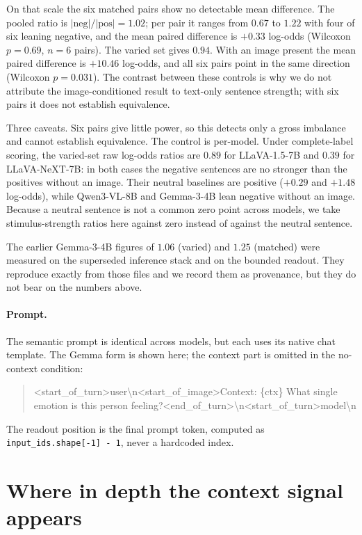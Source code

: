 \documentclass{article}
\newcommand{\gemma}{Gemma-3-4B}
\newcommand{\qwen}{Qwen3-VL-8B}
\newcommand{\llava}{LLaVA-1.5-7B}
\newcommand{\llavanext}{LLaVA-NeXT-7B}
\begin{document}
On that scale the six matched pairs show no detectable mean difference. The pooled ratio is $|\text{neg}|/|\text{pos}|=1.02$; per pair it ranges from $0.67$ to $1.22$ with four of six leaning negative, and the mean paired difference is $+0.33$ log-odds (Wilcoxon $p=0.69$, $n=6$ pairs). The varied set gives $0.94$. With an image present the mean paired difference is $+10.46$ log-odds, and all six pairs point in the same direction (Wilcoxon $p=0.031$). The contrast between these controls is why we do not attribute the image-conditioned result to text-only sentence strength; with six pairs it does not establish equivalence.

Three caveats. Six pairs give little power, so this detects only a gross imbalance and cannot establish equivalence. The control is per-model. Under complete-label scoring, the varied-set raw log-odds ratios are $0.89$ for \llava{} and $0.39$ for \llavanext{}: in both cases the negative sentences are no stronger than the positives without an image. Their neutral baselines are positive ($+0.29$ and $+1.48$ log-odds), while \qwen{} and \gemma{} lean negative without an image. Because a neutral sentence is not a common zero point across models, we take stimulus-strength ratios here against zero instead of against the neutral sentence.

The earlier \gemma{} figures of $1.06$ (varied) and $1.25$ (matched) were measured on the superseded inference stack and on the bounded readout. They reproduce exactly from those files and we record them as provenance, but they do not bear on the numbers above.

\paragraph{Prompt.}
The semantic prompt is identical across models, but each uses its native chat template. The Gemma form is shown here; the context part is omitted in the no-context condition:
\begin{quote}\small\ttfamily
<start\_of\_turn>user\textbackslash n<start\_of\_image>Context: \{ctx\} What single emotion is this person feeling?<end\_of\_turn>\textbackslash n<start\_of\_turn>model\textbackslash n
\end{quote}
The readout position is the final prompt token, computed as \texttt{input\_ids.shape[-1] - 1}, never a hardcoded index.

\section{Where in depth the context signal appears}
\label{app:layerwise}
\end{document}

